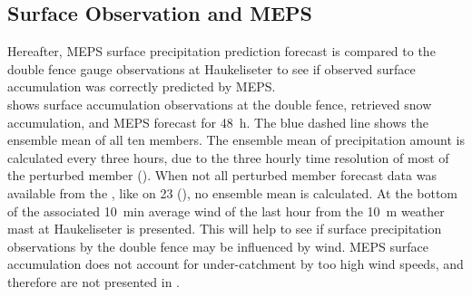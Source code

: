 \subsection{Surface Observation and MEPS}\label{sec:sfc_acc}
Hereafter, MEPS surface precipitation prediction forecast is compared to the double fence gauge observations at Haukeliseter to see if observed surface accumulation was correctly predicted by MEPS.
\\
 shows surface accumulation observations at the double fence, retrieved snow accumulation, and MEPS forecast for \SI{48}{\hour}. 
The blue dashed line shows the ensemble mean of all ten members. The ensemble mean of precipitation amount is calculated every three hours, due to the three hourly time resolution of most of the perturbed member ().
When not all perturbed member forecast data was available from the \citet{norwegian_meteorological_institute_met_2016}, like on \SI{23}{\dec} (), no ensemble mean is calculated. 
At the bottom of  the associated \SI{10}{\minute} average wind of the last hour from the \SI{10}{\metre} weather mast at Haukeliseter is presented. This will help to see if surface precipitation observations by the double fence may be influenced by wind. MEPS surface accumulation does not account for under-catchment by too high wind speeds, and therefore are not presented in .
